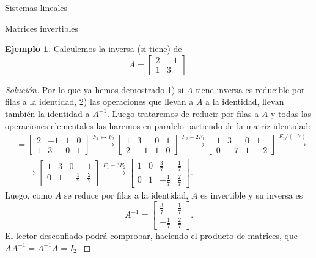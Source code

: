 \documentclass[a4paper,12pt,twoside,spanish]{amsbook}
\theoremstyle{definition}
\newtheorem{ejemplo}{Ejemplo}[section]
\theoremstyle{remark}
\begin{document}
\begin{chapter}{Sistemas lineales}
\begin{section}{Matrices invertibles}
			\begin{ejemplo}
				Calculemos la inversa (si tiene) de 
				\begin{equation*}
				A=\begin{bmatrix}2&-1\\1&3 \end{bmatrix}.
				\end{equation*}
			\end{ejemplo}
			\begin{proof}[Solución] Por lo que ya hemos demostrado 1) si $A$ tiene inversa es reducible por filas a la identidad, 2) las operaciones que llevan a $A$ a la identidad, llevan también la identidad  a $A^{-1}$. Luego  trataremos de reducir por filas a $A$ y todas las operaciones elementales las haremos en paralelo partiendo de la matriz identidad:
				\begin{align*}
				[A|I] &= \left[\begin{array}{cc|cc}2&-1 &  1&0\\1&3& 0&1\end{array}\right] 
				\stackrel{F_1\leftrightarrow F_2}{\longrightarrow} 
				\left[\begin{array}{cc|cc}1&3& 0&1\\2&-1 &  1&0 \end{array}\right]
				\stackrel{F_2-2 F_1}{\longrightarrow}
				\left[\begin{array}{cc|cc}1&3& 0&1\\0&-7 &  1&-2 \end{array}\right]
				\stackrel{F_2/(-7)}{\longrightarrow}\\
				&\quad\longrightarrow 
				\left[\begin{array}{cc|cc}1&3& 0&1\\0&1 &  -\frac17&\frac27\end{array}\right]
				\stackrel{F_1-3 F_2}{\longrightarrow}
				\left[\begin{array}{cc|cc}1&0&  \frac37&\frac17\\0&1 &  -\frac17&\frac27 \end{array}\right].
				\end{align*}
				Luego, como $A$ se reduce por filas a la identidad, $A$ es invertible y su inversa es  
				\begin{equation*}
				A^{-1}=\begin{bmatrix}\frac37&\frac17\\-\frac17&\frac27 \end{bmatrix}.
				\end{equation*}
				El lector desconfiado  podrá comprobar, haciendo el producto de matrices, que $AA^{-1} = A^{-1}A=I_2$.
			\end{proof}
			

\end{section}
\end{chapter}
\end{document}
